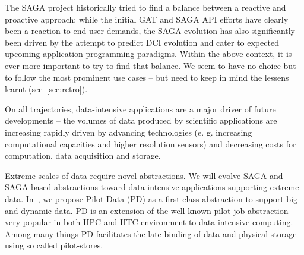 \documentclass[]{article}
\newcommand{\I}[1]{\textit{#1}}
\begin{document}


 The SAGA project historically tried to find a balance between a
 reactive and proactive approach: while the initial GAT and SAGA API
 efforts have clearly been a reaction to end user demands, the SAGA
 evolution has also significantly been driven by the attempt to
 predict DCI evolution and cater to expected upcoming application
 programming paradigms.  
 Within the above context, it is ever more important to try to find
 that balance.  We seem to have no choice but to follow the most
 prominent use cases -- but need to keep in mind the lessens learnt
 (see~\ref{sec:retro}).
 

 On all trajectories, data-intensive applications are a major driver
 of future developments -- the volumes of data produced by scientific
 applications are increasing rapidly driven by advancing technologies
 (e. g. increasing computational capacities and higher resolution
 sensors) and decreasing costs for computation, data acquisition and
 storage.

 Extreme scales of data require novel abstractions. We will evolve
 SAGA and SAGA-based abstractions toward data-intensive applications
 supporting extreme data.  In~\cite{troy-2011}, we propose Pilot-Data
 (PD) as a first class abstraction to support big and dynamic data. PD
 is an extension of the well-known pilot-job abstraction very popular
 in both HPC and HTC environment to data-intensive computing.  Among
 many things PD facilitates the late binding of data and physical
 storage using so called pilot-stores.
\end{document}
